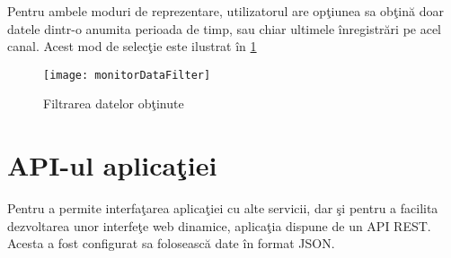 Pentru ambele moduri de reprezentare, utilizatorul are opţiunea sa obţină doar datele dintr-o anumita perioada de timp, sau chiar ultimele înregistrări pe acel canal. Acest mod de selecţie este ilustrat în \cref{fig:monitorDataFilter}
\begin{figure}[H]
	\centering
	\texttt{[image: monitorDataFilter]}
	\caption{Filtrarea datelor obţinute}
	\label{fig:monitorDataFilter}
\end{figure}
\section{API-ul aplicaţiei}
Pentru a permite interfaţarea aplicaţiei cu alte servicii, dar şi pentru a facilita dezvoltarea unor interfeţe web dinamice, aplicaţia dispune de un API REST. Acesta a fost configurat sa folosească date în format JSON.

